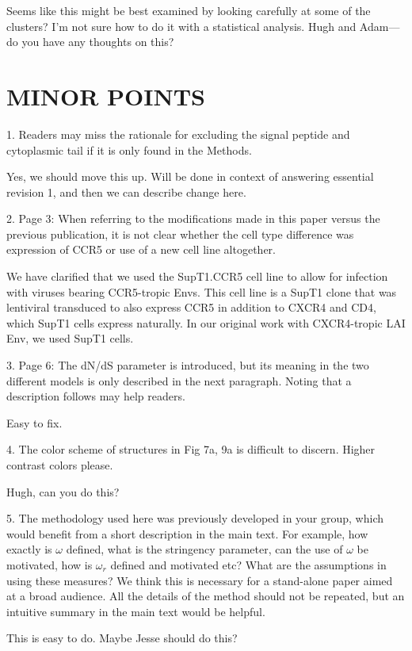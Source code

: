 \documentclass[11pt, oneside]{article}   	%
\begin{document}
{\color{red}
Seems like this might be best examined by looking carefully at some of the clusters?
I'm not sure how to do it with a statistical analysis.
Hugh and Adam---do you have any thoughts on this?
}

\section*{MINOR POINTS}

1. Readers may miss the rationale for excluding the signal peptide and cytoplasmic tail if it is only found in the Methods. 

{\color{red}Yes, we should move this up. Will be done in context of answering essential revision 1, and then we can describe change here.}

2. Page 3: When referring to the modifications made in this paper versus the previous publication, it is not clear whether the cell type difference was expression of CCR5 or use of a new cell line altogether. 

{\color{black}
We have clarified that we used the SupT1.CCR5 cell line to allow for infection with viruses bearing CCR5-tropic Envs. This cell line is a SupT1 clone that was lentiviral transduced to also express CCR5 in addition to CXCR4 and CD4, which SupT1 cells express naturally. In our original work with CXCR4-tropic LAI Env, we used SupT1 cells. 
}

3. Page 6: The dN/dS parameter is introduced, but its meaning in the two different models is only described in the next paragraph. Noting that a description follows may help readers. 

{\color{red}
Easy to fix.}

4. The color scheme of structures in Fig 7a, 9a is difficult to discern. Higher contrast colors please. 

{\color{red}
Hugh, can you do this?}

5. The methodology used here was previously developed in your group, which would benefit from a short description in the main text. For example, how exactly is $\omega$ defined, what is the stringency parameter, can the use of $\omega$ be motivated, how is $\omega_r$ defined and motivated etc? What are the assumptions in using these measures? We think this is necessary for a stand-alone paper aimed at a broad audience. All the details of the method should not be repeated, but an intuitive summary in the main text would be helpful. 

{\color{red}
This is easy to do. Maybe Jesse should do this?}
\end{document}

